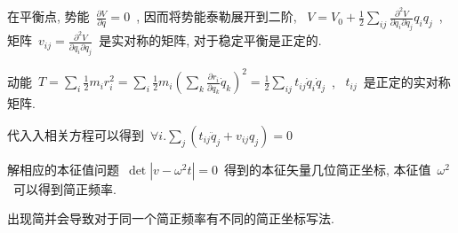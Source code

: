 \documentclass[11pt,a4paper]{article}%
\renewcommand{\[}{~$\displaystyle}
\renewcommand{\]}{$~}%
\begin{document}
	在平衡点, 势能\[\frac{\partial V}{\partial q} = 0\], 因而将势能泰勒展开到二阶, \[V = V_0 + \frac{1}{2}\sum_{ij}\frac{\partial^2 V}{\partial q_i\partial q_j}q_iq_j\], 矩阵\[v_{ij} = \frac{\partial^2 V}{\partial q_i\partial q_j}\]是实对称的矩阵, 对于稳定平衡是正定的. 
	
	动能\[T = \sum_i \frac 12 m_i r_i^2 = \sum_i \frac 12 m_i \left(\sum_k\frac{\partial r_i}{\partial q_k}\dot q_k\right)^2 = \frac{1}{2}\sum_{ij}t_{ij}\dot q_i\dot q_j\], \[t_{ij}\]是正定的实对称矩阵. 
	
	代入入相关方程可以得到\[\forall i. \sum_j \left(t_{ij}\ddot q_j + v_{ij}q_j\right) = 0\]
	
	解相应的本征值问题\[\det|v-\omega^2t|=0\]得到的本征矢量几位简正坐标, 本征值\[\omega^2\]可以得到简正频率. 
	
	出现简并会导致对于同一个简正频率有不同的简正坐标写法. 
\end{document}
